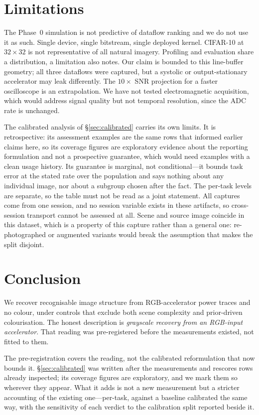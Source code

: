 \documentclass[10pt,conference]{article}
\begin{document}
\section{Limitations}

The Phase~0 simulation is not predictive of dataflow ranking and we do not use it as
such. Single device, single bitstream, single deployed kernel. CIFAR-10 at $32\times32$ is not
representative of all natural imagery. Profiling and evaluation share a distribution, a
limitation \cite{wei2018} also notes. Our claim is bounded to this line-buffer geometry; all three dataflows were captured,
but a systolic or output-stationary accelerator may leak differently. The $10\times$ SNR projection for a faster oscilloscope is an
extrapolation. We have not tested electromagnetic acquisition, which would address
signal quality but not temporal resolution, since the ADC rate is unchanged.

The calibrated analysis of \S\ref{sec:calibrated} carries its own limits. It is
retrospective: its assessment examples are the same rows that informed earlier claims
here, so its coverage figures are exploratory evidence about the reporting formulation
and not a prospective guarantee, which would need examples with a clean usage history.
Its guarantee is marginal, not conditional---it bounds task error at the stated rate
over the population and says nothing about any individual image, nor about a subgroup
chosen after the fact. The per-task levels are separate, so the table must not be read
as a joint statement. All captures come from one session, and no session variable
exists in these artifacts, so cross-session transport cannot be assessed at all. Scene
and source image coincide in this dataset, which is a property of this capture rather
than a general one: re-photographed or augmented variants would break the assumption
that makes the split disjoint.

\section{Conclusion}

We recover recognisable image structure from RGB-accelerator power traces and no colour,
under controls that exclude both scene complexity and prior-driven colourisation. The
honest description is \emph{grayscale recovery from an RGB-input accelerator}. That
reading was pre-registered before the measurements existed, not fitted to them.

The pre-registration covers the reading, not the calibrated reformulation that now
bounds it. \S\ref{sec:calibrated} was written after the measurements and rescores rows
already inspected; its coverage figures are exploratory, and we mark them so wherever
they appear. What it adds is not a new measurement but a stricter accounting of the
existing one---per-task, against a baseline calibrated the same way, with the
sensitivity of each verdict to the calibration split reported beside it.
\end{document}
